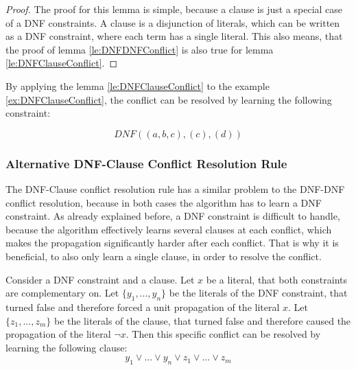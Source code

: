 \begin{proof}
The proof for this lemma is simple, because a clause is just a special case of a DNF constraints. A clause is a disjunction of literals, which can be written as a DNF constraint, where each term has a single literal. This also means, that the proof of lemma \ref{le:DNFDNFConflict} is also true for lemma \ref{le:DNFClauseConflict}.
\end{proof}

By applying the lemma \ref{le:DNFClauseConflict} to the example \ref{ex:DNFClauseConflict}, the conflict can be resolved by learning the following constraint:

\begin{leftbar}
\begin{displaymath}
DNF((a,b,c),(c),(d))
\end{displaymath}
\end{leftbar}

\subsubsection{Alternative DNF-Clause Conflict Resolution Rule}

The DNF-Clause conflict resolution rule has a similar problem to the DNF-DNF conflict resolution, because in both cases the algorithm has to learn a DNF constraint. As already explained before, a DNF constraint is difficult to handle, because the algorithm effectively learns several clauses at each conflict, which makes the propagation significantly harder after each conflict. That is why it is beneficial, to also only learn a single clause, in order to resolve the conflict.

\begin{lemma}
\begin{leftbar}
Consider a DNF constraint and a clause. Let $x$ be a literal, that both constraints are complementary on. Let $\{y_1,...,y_n\}$ be the literals of the DNF constraint, that turned false and therefore forced a unit propagation of the literal $x$. Let $\{z_1,...,z_m\}$ be the literals of the clause, that turned false and therefore caused the propagation of the literal $\neg x$. Then this specific conflict can be resolved by learning the following clause:
\begin{displaymath}
y_1 \vee ... \vee y_n \vee z_1 \vee ... \vee z_m
\end{displaymath}
\end{leftbar}
\label{le:DNFClauseConflictAlt}
\end{lemma}


